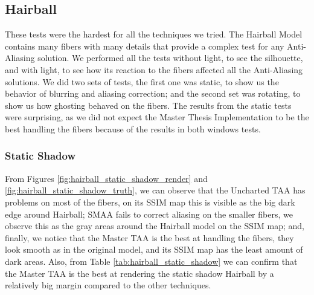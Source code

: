 \documentclass[pregrado]{tesis-usb} %
\begin{document}
\subsection{Hairball}
These tests were the hardest for all the techniques we tried. The Hairball Model contains many fibers with many details that provide a complex test for any Anti-Aliasing solution. We performed all the tests without light, to see the silhouette, and with light, to see how its reaction to the fibers affected all the Anti-Aliasing solutions. We did two sets of tests, the first one was static, to show us the behavior of blurring and aliasing correction; and the second set was rotating, to show us how ghosting behaved on the fibers. The results from the static tests were surprising, as we did not expect the Master Thesis Implementation to be the best handling the fibers because of the results in both windows tests.
\subsubsection{Static Shadow}
From Figures \ref{fig:hairball_static_shadow_render} and \ref{fig:hairball_static_shadow_truth}, we can observe that the Uncharted TAA has problems on most of the fibers, on its SSIM map this is visible as the big dark edge around Hairball; SMAA fails to correct aliasing on the smaller fibers, we observe this as the gray areas around the Hairball model on the SSIM map; and, finally, we notice that the Master TAA is the best at handling the fibers, they look smooth as in the original model, and its SSIM map has the least amount of dark areas. Also, from Table \ref{tab:hairball_static_shadow} we can confirm that the Master TAA is the best at rendering the static shadow Hairball by a relatively big margin compared to the other techniques.
\end{document}
